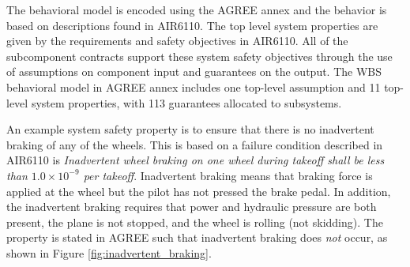 


The behavioral model is encoded using the AGREE annex and the behavior is based on descriptions found in AIR6110. The top level system properties are given by the requirements and safety objectives in AIR6110. All of the subcomponent contracts support these system safety objectives through the use of assumptions on component input and guarantees on the output. The WBS behavioral model in AGREE annex includes one top-level assumption and  11 top-level system properties, with 113 guarantees allocated to subsystems.  

An example system safety property is to ensure that there is no inadvertent braking of any of the wheels. This is based on a failure condition described in AIR6110 is \textit{Inadvertent wheel braking on one wheel during takeoff shall be less than %
$1.0\times 10^{-9}$ per takeoff}. 
Inadvertent braking means that braking force is applied at the wheel but the pilot has not pressed the brake pedal.  In addition, the inadvertent braking requires that power and hydraulic pressure are both present, the plane is not stopped, and the wheel is rolling (not skidding). The property is stated in AGREE such that inadvertent braking does \textit{not} occur, as shown in Figure \ref{fig:inadvertent_braking}. 

